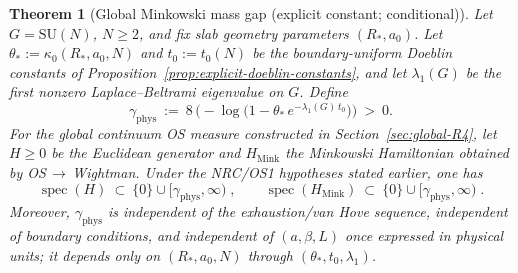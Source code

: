 \documentclass[11pt]{amsart}
\theoremstyle{plain}
\newtheorem{theorem}{Theorem}[section]
\theoremstyle{definition}
\theoremstyle{remark}
\begin{document}
\begin{theorem}[Global Minkowski mass gap (explicit constant; conditional)]\label{thm:global-minkowski-gap}
Let $G=\mathrm{SU}(N)$, $N\ge 2$, and fix slab geometry parameters $(R_*,a_0)$. Let $\theta_*:=\kappa_0(R_*,a_0,N)$ and $t_0:=t_0(N)$ be the boundary-uniform Doeblin constants of Proposition~\ref{prop:explicit-doeblin-constants}, and let $\lambda_1(G)$ be the first nonzero Laplace--Beltrami eigenvalue on $G$. Define
\[
  \gamma_{\mathrm{phys}}\ :=\ 8\,\Big(-\log\big(1-\theta_*\,e^{-\lambda_1(G)\,t_0}\big)\Big)\ >\ 0.
\]
For the global continuum OS measure constructed in Section~\ref{sec:global-R4}, let $H\ge 0$ be the Euclidean generator and $H_{\mathrm{Mink}}$ the Minkowski Hamiltonian obtained by OS\,$\to$\,Wightman. Under the NRC/OS1 hypotheses stated earlier, one has
\[
  \operatorname{spec}(H)\ \subset\ \{0\}\cup[\gamma_{\mathrm{phys}},\infty)\;,\qquad
  \operatorname{spec}(H_{\mathrm{Mink}})\ \subset\ \{0\}\cup[\gamma_{\mathrm{phys}},\infty)\;.
\]
Moreover, $\gamma_{\mathrm{phys}}$ is independent of the exhaustion/van Hove sequence, independent of boundary conditions, and independent of $(a,\beta,L)$ once expressed in physical units; it depends only on $(R_*,a_0,N)$ through $(\theta_*,t_0,\lambda_1)$.
\end{theorem}
\end{document}
